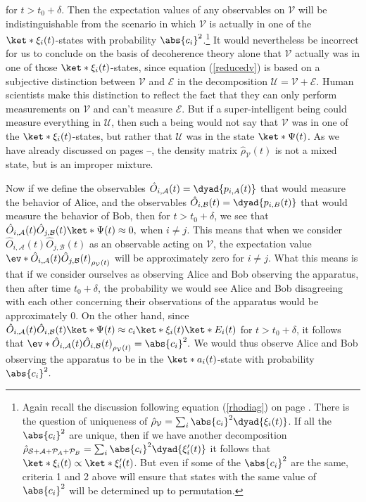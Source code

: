 \documentclass[12pt]{report}
\begin{document}
      for $t>t_0+\delta.$ Then the expectation values of any observables on $\mathcal{V}$ will be indistinguishable from the scenario in which $\mathcal{V}$ is actually in one of the $\ket*{\xi_i(t)}$-states with probability $\abs{c_i}^2$.\footnote{Again recall the discussion following equation (\ref{rhodiag}) on page \pageref{rhodiag}. There is the question of uniqueness of $\hat{\rho}_{\mathcal{V}}=\sum_{i}\abs{c_i}^2\dyad{\xi_i(t)}$. If all the $\abs{c_i}^2$ are unique, then if we have another decomposition $\hat{\rho}_{\mathcal{S}+\mathcal{A}+\mathcal{P}_A+\mathcal{P}_B}=\sum_{i}\abs{c_i}^2\dyad{\xi_i'(t)}$ it follows that $\ket*{\xi_i(t)}\propto\ket*{\xi_i'(t)}$. But even if some of the $\abs{c_i}^2$ are the same, criteria 1 and 2 above will ensure that states with the same  value of $\abs{c_i}^2$ will be determined up to permutation.} It would nevertheless be incorrect for us to conclude on the basis of decoherence theory alone that $\mathcal{V}$ actually was in one of those $\ket*{\xi_i(t)}$-states, since equation (\ref{reducedv}) is based on a subjective distinction between $\mathcal{V}$ and $\mathcal{E}$ in the decomposition $\mathcal{U}=\mathcal{V}+\mathcal{E}.$ Human scientists make this distinction to reflect the fact that they can only perform measurements on $\mathcal{V}$ and can't measure $\mathcal{E}$. But if a super-intelligent being could measure everything in  $\mathcal{U}$, then such a being would not say that $\mathcal{V}$ was in one of the  $\ket*{\xi_i(t)}$-states, but rather that $\mathcal{U}$ was in the state $\ket*{\Psi(t)}$. As we have already discussed on pages \pageref{subtle}--\pageref{subtleend}, the density matrix $ \hat{\rho}_{\mathcal{V}}(t)$ is not a mixed state, but is an improper mixture. 

    Now if we define the observables $\hat{O}_{i,\mathcal{A}}(t)=\dyad{p_{i,A}(t)}$ that %
%
    would measure the behavior of Alice, and the observables $\hat{O}_{i,\mathcal{B}}(t)=\dyad{p_{i,B}(t)}$ that would measure the behavior of Bob, then for $t>t_0+\delta$, we see that $\hat{O}_{i,\mathcal{A}}(t)\hat{O}_{j,\mathcal{B}}(t)\ket*{\Psi(t)}\approx 0,$ when $i\neq j$. This means that when we consider $\hat{O}_{i,\mathcal{A}}(t)\hat{O}_{j,\mathcal{B}}(t)$ as an observable acting on $\mathcal{V}$,  the expectation value $\ev*{\hat{O}_{i,\mathcal{A}}(t)\hat{O}_{j,\mathcal{B}}(t)}_{\rho_\mathcal{V}(t)}$ will be approximately zero for $i\neq j$. What this means is that if we consider ourselves as observing Alice and Bob observing the apparatus, then after time $t_0+\delta$, the probability we would see Alice and Bob disagreeing with each other concerning their observations of the apparatus would be approximately 0. 
     On the other hand, since $\hat{O}_{i,\mathcal{A}}(t)\hat{O}_{i,\mathcal{B}}(t)\ket*{\Psi(t)} \approx c_i \ket*{\xi_i(t)}\ket*{E_i(t)}$ for $t>t_0+\delta$, it follows that $\ev*{\hat{O}_{i,\mathcal{A}}(t)\hat{O}_{i,\mathcal{B}}(t)}_{\rho_\mathcal{V}(t)}=\abs{c_i}^2.$ 
     We would thus observe Alice and Bob observing the apparatus to be in the $\ket*{a_i(t)}$-state with probability $\abs{c_i}^2.$ 
\end{document}
